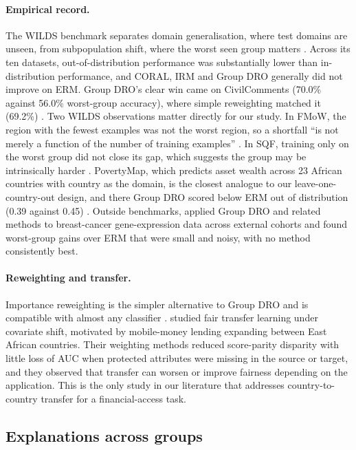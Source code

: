 \documentclass[11pt]{article}
\begin{document}
\paragraph{Empirical record.} The WILDS benchmark separates domain generalisation, where test domains are unseen, from subpopulation shift, where the worst seen group matters \citep[pp.~7--8]{koh2021wilds}. Across its ten datasets, out-of-distribution performance was substantially lower than in-distribution performance, and CORAL, IRM and Group DRO generally did not improve on ERM. Group DRO's clear win came on CivilComments (70.0\% against 56.0\% worst-group accuracy), where simple reweighting matched it (69.2\%) \citep[pp.~20--22, 92]{koh2021wilds}. Two WILDS observations matter directly for our study. In FMoW, the region with the fewest examples was not the worst region, so a shortfall ``is not merely a function of the number of training examples'' \citep[pp.~96--99]{koh2021wilds}. In SQF, training only on the worst group did not close its gap, which suggests the group may be intrinsically harder \citep[pp.~113--115]{koh2021wilds}. PovertyMap, which predicts asset wealth across 23 African countries with country as the domain, is the closest analogue to our leave-one-country-out design, and there Group DRO scored below ERM out of distribution (0.39 against 0.45) \citep[pp.~102--105]{koh2021wilds}. Outside benchmarks, \citet{stahlschmidt2024domain} applied Group DRO and related methods to breast-cancer gene-expression data across external cohorts and found worst-group gains over ERM that were small and noisy, with no method consistently best.

\paragraph{Reweighting and transfer.} Importance reweighting is the simpler alternative to Group DRO and is compatible with almost any classifier \citep[pp.~12--13]{barrainkua2025preserving}. \citet{coston2019fair} studied fair transfer learning under covariate shift, motivated by mobile-money lending expanding between East African countries. Their weighting methods reduced score-parity disparity with little loss of AUC when protected attributes were missing in the source or target, and they observed that transfer can worsen or improve fairness depending on the application. This is the only study in our literature that addresses country-to-country transfer for a financial-access task.

\subsection{Explanations across groups}
\end{document}
